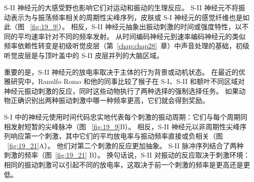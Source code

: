 S-II 神经元的大感受野也影响它们对运动和振动的生理反应。
S-II 神经元不将振动表示为与振荡频率相关的周期性尖峰序列，皮肤或 S-I 神经元的感觉纤维也是如此（图 ~\ref{fig:19_9}）。
相反，S-II 神经元抽象出振动刺激的时间或强度特性，以不同的平均速率针对不同的频率发射。
从时间编码神经元到速率编码神经元的类似频率依赖性转变是初级听觉皮层（第~\ref{chap:chap28}~章）中声音处理的基础，初级听觉皮层是与顶叶盖中的 S-II 皮层并列的大脑区域。


重要的是，S-II 神经元的放电率取决于主体的行为背景或动机状态。
在最近的优雅研究中，Ranulfo Romo 和他的同事比较了猴子在 S-I、S-II 和额叶不同区域对神经元振动刺激的反应，同时这些动物执行了两种选择的强制选择任务。
如果动物正确识别出两种振动刺激中哪一种频率更高，它们就会得到奖励。


S-I 中的神经元使用时间代码忠实地代表每个刺激的振动周期：它们与每个周期同相发射短暂的尖峰脉冲（图 ~\ref{fig:19_9}B）。
相反，S-II 神经元以非周期性尖峰序列响应第一个刺激，其中它们的平均放电率与振动频率直接或负相关（图 ~\ref{fig:19_21}A）。
他们对第二个刺激的反应更加抽象。
S-II 脉冲序列结合了两种刺激的频率（图~\ref{fig:19_21} B）。
换句话说，S-II 对振动的反应取决于刺激环境：
相同的振动刺激可以引起不同的放电率，这取决于前一个刺激的频率是更高还是更低。


